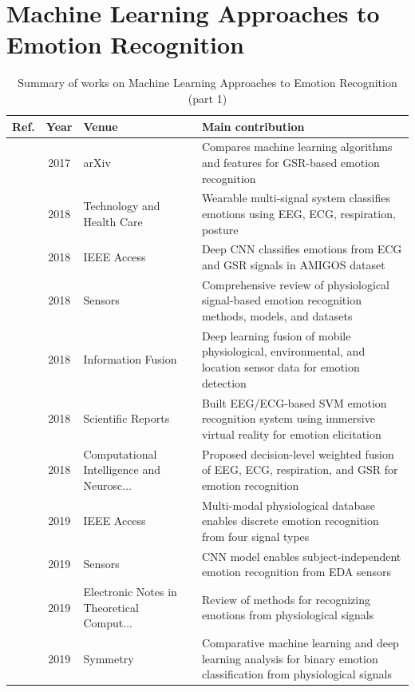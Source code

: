 \section{Machine Learning Approaches to Emotion Recognition}\label{sec:theme0}
\begin{table}[!t]
\centering
\renewcommand{\arraystretch}{1.2}
\caption{Summary of works on Machine Learning Approaches to Emotion Recognition (part 1)}\label{tab:theme0}
\begin{tabularx}{\textwidth}{@{}l c p{3.6cm} X@{}}
\toprule
\textbf{Ref.} & \textbf{Year} & \textbf{Venue} & \textbf{Main contribution} \\
\midrule
\cite{ayata2017emotion} & 2017 & arXiv & Compares machine learning algorithms and features for GSR-based emotion recognition \\
\cite{liu2018human} & 2018 & Technology and Health Care & Wearable multi-signal system classifies emotions using EEG, ECG, respiration, posture \\
\cite{granados2018deep} & 2018 & IEEE Access & Deep CNN classifies emotions from ECG and GSR signals in AMIGOS dataset \\
\cite{shu2018review} & 2018 & Sensors & Comprehensive review of physiological signal-based emotion recognition methods, models, and datasets \\
\cite{kanjo2018deep} & 2018 & Information Fusion & Deep learning fusion of mobile physiological, environmental, and location sensor data for emotion detection \\
\cite{marinmorales2018affective} & 2018 & Scientific Reports & Built EEG/ECG-based SVM emotion recognition system using immersive virtual reality for emotion elicitation \\
\cite{wei2018emotion} & 2018 & Computational Intelligence and Neurosc... & Proposed decision-level weighted fusion of EEG, ECG, respiration, and GSR for emotion recognition \\
\cite{song2019mped} & 2019 & IEEE Access & Multi-modal physiological database enables discrete emotion recognition from four signal types \\
\cite{machot2019deep} & 2019 & Sensors & CNN model enables subject-independent emotion recognition from EDA sensors \\
\cite{egger2019emotion} & 2019 & Electronic Notes in Theoretical Comput... & Review of methods for recognizing emotions from physiological signals \\
\cite{balan2019emotion} & 2019 & Symmetry & Comparative machine learning and deep learning analysis for binary emotion classification from physiological signals \\

\end{tabularx}
\end{table}
